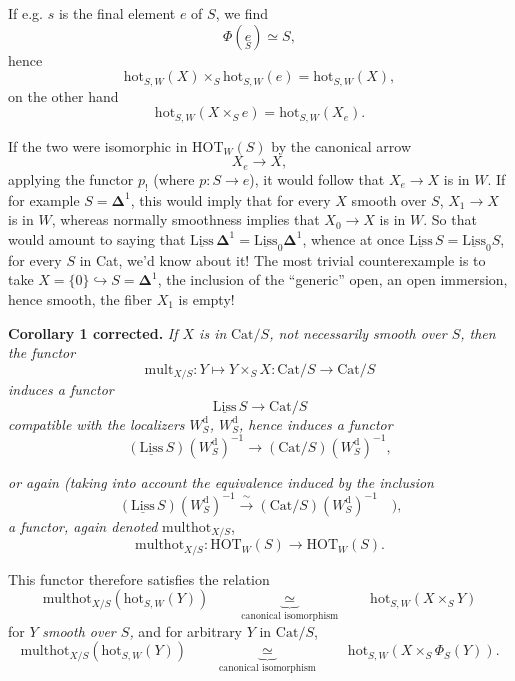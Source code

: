 \documentclass[11pt]{article}
\newcommand{\printedpage}[1]{\marginpar{\footnotesize p.~#1}}
\newcommand{\msp}[1]{\marginpar{\footnotesize [#1]}}
\newcommand{\hot}{\mathrm{hot}}
\newcommand{\HOT}{\mathrm{HOT}}
\newcommand{\Cat}{\mathrm{Cat}}
\newcommand{\Liss}{\underline{\mathrm{Liss}}}
\newcommand{\multhot}{\mathrm{multhot}}
\newcommand{\mult}{\mathrm{mult}}
\begin{document}
\printedpage{94}
If e.g. $s$ is the final element $e$ of $S$, we find
\[\Phi(\underset{S}{e}) \simeq S,\]
hence
\[\hot_{S,W}(X)\times_S \hot_{S,W}(e)=\hot_{S,W}(X),\]
on the other hand
\[\hot_{S,W}(X\times_S e)=\hot_{S,W}(X_e).\]

\msp{154}
If the two were isomorphic in $\HOT_W(S)$ by the canonical arrow
\[X_e\longrightarrow X,\]
applying the functor $p_!$ (where $p : S\longrightarrow e$), it would follow that $X_e\longrightarrow X$ is in $W$. If for example $S=\mathbf{\Delta}^1$, this would imply that for every $X$ smooth over $S$, $X_1\longrightarrow X$ is in $W$, whereas normally smoothness implies that $X_0\longrightarrow X$ is in $W$. So that would amount to saying that $\Liss\,\mathbf{\Delta}^1=\Liss_0\mathbf{\Delta}^1$, whence at once $\Liss\,S=\Liss_0S$, for every $S$ in Cat, we'd know about it! The most trivial counterexample is to take $X=\{0\}\hookrightarrow S=\mathbf{\Delta}^1$, the inclusion of the ``generic'' open, an open immersion, hence smooth, the fiber $X_1$ is empty! %

\textbf{Corollary 1 corrected.} \textit{If $X$ is in} $\Cat/S$\textit{, not necessarily smooth over $S$, then the functor}
\[\mult_{X/S} : Y\longmapsto Y\times_S X : \Cat/S\longrightarrow \Cat/S\]
\textit{induces a functor}
\[\Liss\,S\longrightarrow \Cat/S\]
\textit{compatible with the localizers $W_S^{\mathrm{d}}$, $W_S^{\mathrm{d}}$, hence induces a functor}
\[(\Liss\,S)(W_S^{\mathrm{d}})^{-1}\longrightarrow(\Cat/S)(W_S^{\mathrm{d}})^{-1},\]

\msp{155}
\textit{or again (taking into account the equivalence induced by the inclusion}
\[(\underline{\mathrm{Liss}}\,S)(W_S^{\mathrm{d}})^{-1}\xrightarrow{\ \sim\ }(\Cat/S)(W_S^{\mathrm{d}})^{-1}\quad\textit{),}\] %
\textit{a functor, again denoted} $\multhot_{X/S}$,
\[\multhot_{X/S} : \HOT_W(S)\longrightarrow\HOT_W(S).\]

This functor therefore satisfies the relation
\[\multhot_{X/S}(\hot_{S,W}(Y))\qquad\underbrace{\ \simeq\ }_{\text{canonical isomorphism}}\qquad\hot_{S,W}(X\times_S Y)\]
\printedpage{95}
for $Y$ \textit{smooth over $S$,} and for arbitrary $Y$ in $\Cat/S$,
\[\multhot_{X/S}(\hot_{S,W}(Y))\qquad\underbrace{\ \simeq\ }_{\text{canonical isomorphism}}\qquad\hot_{S,W}(X\times_S \Phi_S(Y)).\]
\end{document}
